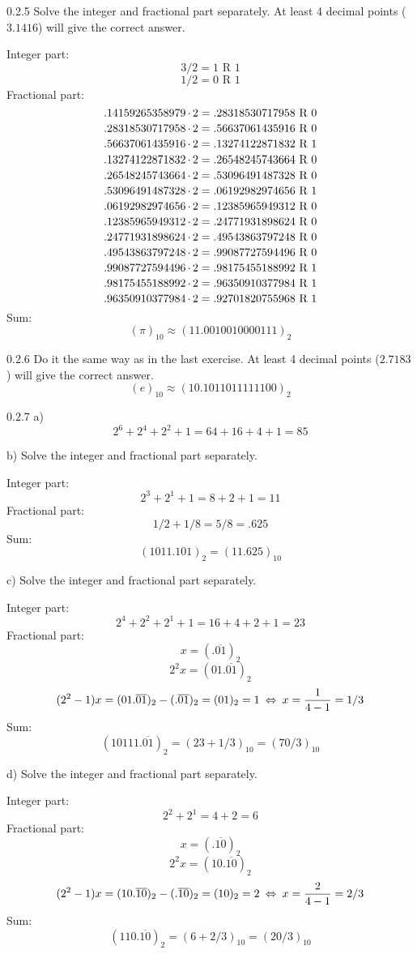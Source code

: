 \begin{task}{0.2.5}
Solve the integer and fractional part separately. At least 4 decimal points ($3.1416$) will give the correct answer.

Integer part:
\[3/2=1\text{ R }1\]
\[1/2=0\text{ R }1\]
Fractional part:
\[.14159265358979\operatorname{\cdot}2=.28318530717958\text{ R }0\]
\[.28318530717958\operatorname{\cdot}2=.56637061435916\text{ R }0\]
\[.56637061435916\operatorname{\cdot}2=.13274122871832\text{ R }1\]
\[.13274122871832\operatorname{\cdot}2=.26548245743664\text{ R }0\]
\[.26548245743664\operatorname{\cdot}2=.53096491487328\text{ R }0\]
\[.53096491487328\operatorname{\cdot}2=.06192982974656\text{ R }1\]
\[.06192982974656\operatorname{\cdot}2=.12385965949312\text{ R }0\]
\[.12385965949312\operatorname{\cdot}2=.24771931898624\text{ R }0\]
\[.24771931898624\operatorname{\cdot}2=.49543863797248\text{ R }0\]
\[.49543863797248\operatorname{\cdot}2=.99087727594496\text{ R }0\]
\[.99087727594496\operatorname{\cdot}2=.98175455188992\text{ R }1\]
\[.98175455188992\operatorname{\cdot}2=.96350910377984\text{ R }1\]
\[.96350910377984\operatorname{\cdot}2=.92701820755968\text{ R }1\]
Sum:
\[(\pi)_{10}\approx(11.0010010000111)_2\]
\end{task}

\begin{task}{0.2.6}
Do it the same way as in the last exercise. At least 4 decimal points ($2.7183$) will give the correct answer.
\[(e)_{10}\approx(10.1011011111100)_2\]
\end{task}

\begin{task}{0.2.7 a)}
\[2^6+2^4+2^2+1=64+16+4+1=85\]
\end{task}

\begin{task}{b)}
Solve the integer and fractional part separately.

Integer part:
\[2^3+2^1+1=8+2+1=11\]
Fractional part:
\[1/2+1/8=5/8=.625\]
Sum:
\[(1011.101)_2=(11.625)_{10}\]
\end{task}

\begin{task}{c)}
Solve the integer and fractional part separately.

Integer part:
\[2^4+2^2+2^1+1=16+4+2+1=23\]
Fractional part:
\[x=(.\overline{01})_2\]
\[2^2x=(01.\overline{01})_2\]
\[(2^2-1)x=(01.\overline{01})_2-(.\overline{01})_2=(01)_2=1\lra 
x= \dfrac{1}{4-1}=1/3\]
Sum:
\[(10111.\overline{01})_2=(23+1/3)_{10}=(70/3)_{10}\]
\end{task}

\begin{task}{d)}
Solve the integer and fractional part separately.

Integer part:
\[2^2+2^1=4+2=6\]
Fractional part:
\[x=(.\overline{10})_2\]
\[2^2x=(10.\overline{10})_2\]
\[(2^2-1)x=(10.\overline{10})_2-(.\overline{10})_2=(10)_2=2\lra 
x= \dfrac{2}{4-1}=2/3\]
Sum:
\[(110.\overline{10})_2=(6+2/3)_{10}=(20/3)_{10}\]
\end{task}

